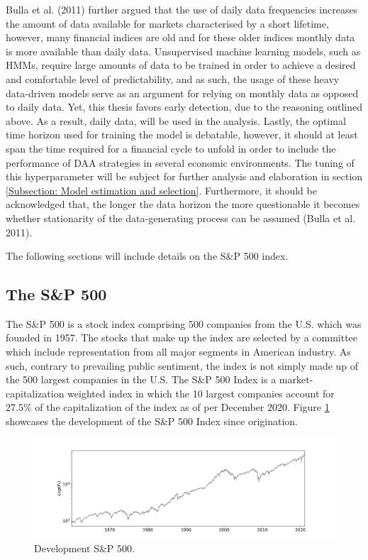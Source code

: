 Bulla et al. (2011) further argued that the use of daily data frequencies increases the amount of data available for markets characterised by a short lifetime, however, many financial indices are old and for these older indices monthly data is more available than daily data. Unsupervised machine learning models, such as HMMs, require large amounts of data to be trained in order to achieve a desired and comfortable level of predictability, and as such, the usage of these heavy data-driven models serve as an argument for relying on monthly data as opposed to daily data. Yet, this thesis favors early detection, due to the reasoning outlined above. As a result, daily data, will be used in the analysis. Lastly, the optimal time horizon used for training the model is debatable, however, it should at least span the time required for a financial cycle to unfold in order to include the performance of DAA strategies in several economic environments. The tuning of this hyperparameter will be subject for further analysis and elaboration in section \ref{Subsection: Model estimation and selection}. Furthermore, it should be acknowledged that, the longer the data horizon the more questionable it becomes whether stationarity of the data-generating process can be assumed (Bulla et al. 2011).

The following sections will include details on the S\&P 500 index.
 
\subsection{The S\&P 500}
The S\&P 500 is a stock index comprising 500 companies from the U.S. which was founded in 1957. The stocks that make up the index are selected by a committee which include representation from all major segments in American industry. As such, contrary to prevailing public sentiment, the index is not simply made up of the 500 largest companies in the U.S. The S\&P 500 Index is a market-capitalization weighted index in which the 10 largest companies account for 27.5\% of the capitalization of the index as of per December 2020. Figure \ref{fig: SP500_index} showcases the development of the S\&P 500 Index since origination. 
 
\begin{figure}[H] 
    \centering
    \includegraphics[width=1\textwidth]{analysis/data_description/images/SP500_index.png}
    \caption{Development S\&P 500.}
    \label{fig: SP500_index}
\end{figure}

